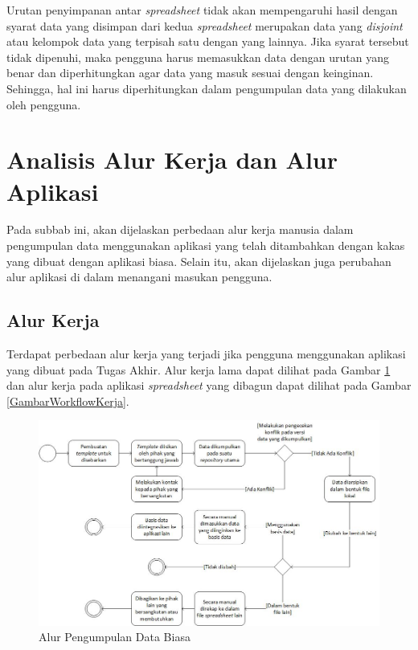 Urutan penyimpanan antar \textit{spreadsheet} tidak akan mempengaruhi hasil dengan syarat data yang disimpan dari kedua \textit{spreadsheet} merupakan data yang \textit{disjoint} atau kelompok data yang terpisah satu dengan yang lainnya. Jika syarat tersebut tidak dipenuhi, maka pengguna harus memasukkan data dengan urutan yang benar dan diperhitungkan agar data yang masuk sesuai dengan keinginan. Sehingga, hal ini harus diperhitungkan dalam pengumpulan data yang dilakukan oleh pengguna.

\section{Analisis Alur Kerja dan Alur Aplikasi} \label{Aluralur}
Pada subbab ini, akan dijelaskan perbedaan alur kerja manusia dalam pengumpulan data menggunakan aplikasi yang telah ditambahkan dengan kakas yang dibuat dengan aplikasi biasa. Selain itu, akan dijelaskan juga perubahan alur aplikasi di dalam menangani masukan pengguna.

\subsection{Alur Kerja}
Terdapat perbedaan alur kerja yang terjadi jika pengguna menggunakan aplikasi yang dibuat pada Tugas Akhir. Alur kerja lama dapat dilihat pada Gambar \ref{GambarWorkflowKerjaBiasa} dan alur kerja pada aplikasi \textit{spreadsheet} yang dibagun dapat dilihat pada Gambar \ref{GambarWorkflowKerja}.

\begin{figure}[!htb]
    \centering
    \includegraphics[width=1\textwidth]{resources/chapter-3-workflow-kerja-biasa.jpg}
    \caption{Alur Pengumpulan Data Biasa}
	\label{GambarWorkflowKerjaBiasa}
\end{figure}

